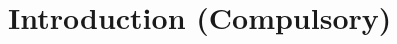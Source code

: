 \documentclass[a4paper,sort&compress,11pt]{article}
\begin{document}
\journalheader
\section{Introduction (Compulsory)}

\label{pp}
\end{document}
